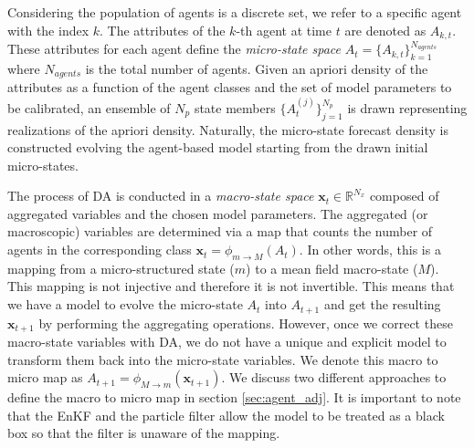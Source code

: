 \documentclass[11pt,a4paper]{article}
\renewcommand{\v}[1]{\ensuremath{\mathbf{#1}}}
\begin{document}
Considering the population of agents is a discrete set, we refer to a specific agent with the index $k$. The attributes of the $k$-th agent at time $t$ are denoted as $A_{k,t}$. These attributes for each agent define the \textit{micro-state space} $A_{t}=\{A_{k, t}\}_{k=1}^{N_{agents}}$ where $N_{agents}$ is the total number of agents. Given an apriori density of the attributes as a function of the agent classes and the set of model parameters to be calibrated, an ensemble of $N_p$ state members $\{A_t^{(j)}\}_{j=1}^{N_p}$ is drawn representing realizations of the apriori density. Naturally, the micro-state forecast density is constructed evolving the agent-based model starting from the drawn initial micro-states.

The process of DA is conducted in a \textit{macro-state space} $\v x_t \in \mathbb{R}^{N_x}$ composed of aggregated variables and the chosen model parameters. The aggregated (or macroscopic) variables are determined via a map that counts the number of agents in the corresponding class  $\v x_t = \phi_{m\rightarrow M}(A_t)$. In other words, this is a mapping from a micro-structured state ($m$) to a  mean field macro-state ($M$). This mapping is not injective and therefore it is not invertible. This means that we have a model to evolve the micro-state $A_t$ into $A_{t+1}$ and get the resulting $\v x_{t+1}$ by performing the aggregating operations. However, once we correct these macro-state variables with DA, we do not have a unique and explicit model to transform them back into the micro-state variables. We denote this macro to micro map as  $A_{t+1}=\phi_{M\rightarrow m}(\v x_{t+1})$.  We discuss two different approaches to define the macro to micro map in section \ref{sec:agent_adj}. It is important to note that the EnKF and the particle filter allow the model to be treated as a black box so that the filter is unaware of the mapping.
\end{document}

